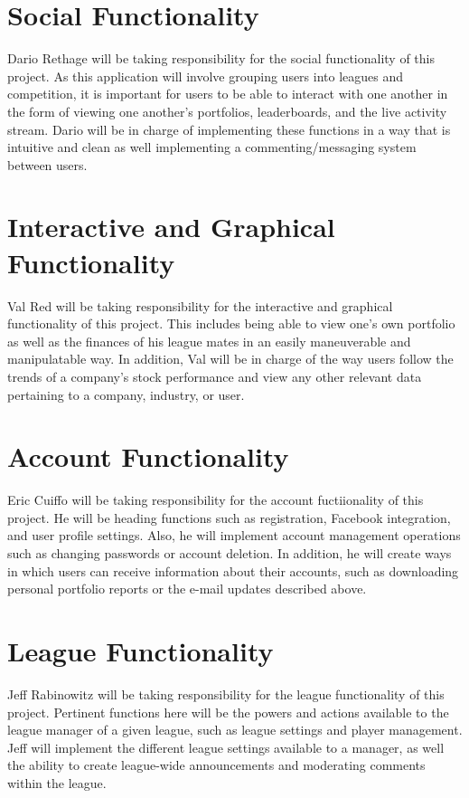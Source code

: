 \documentclass[11pt,letterpaper,oneside]{memoir}
\begin{document}
\section{Social Functionality}

Dario Rethage will be taking responsibility for the social functionality of this project. As this
application will involve grouping users into leagues and competition, it is important for users
to be able to interact with one another in the form of viewing one another's portfolios,
leaderboards, and the live activity stream. Dario will be in charge of implementing these functions
in a way that is intuitive and clean as well implementing a commenting/messaging system
between users.

\section{Interactive and Graphical Functionality}

Val Red will be taking responsibility for the interactive and graphical functionality of this project.
This includes being able to view one's own portfolio as well as the finances of his league mates in
an easily maneuverable and manipulatable way. In addition, Val will be in charge of the way
users follow the trends of a company's stock performance and view any other relevant data
pertaining to a company, industry, or user.

\section{Account Functionality}
Eric Cuiffo will be taking responsibility for the account fuctiionality of this project. He will be
heading functions such as registration, Facebook integration, and user profile settings. Also,
he will implement account management operations such as changing passwords or account deletion.
In addition, he will create ways in which users can receive information about their accounts, such
as downloading personal portfolio reports or the e-mail updates described above.

\section{League Functionality}
Jeff Rabinowitz will be taking responsibility for the league functionality of this project. Pertinent
functions here will be the powers and actions available to the league manager of a given league,
such as league settings and player management. Jeff will implement the different league
settings available to a manager, as well the ability to create league-wide announcements and
moderating comments within the league.
\end{document}
